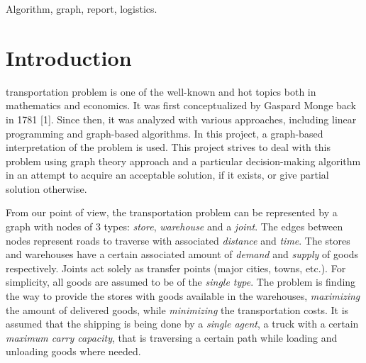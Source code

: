 \documentclass[journal,onecolumn]{IEEEtran}
\begin{document}
\begin{IEEEkeywords}
Algorithm, graph, report, logistics.
\end{IEEEkeywords}

%
\IEEEpeerreviewmaketitle



\section{Introduction}
 transportation problem is one of the well-known and hot topics both in mathematics and economics.
It was first conceptualized by Gaspard Monge back in 1781 [1]. Since then, it was analyzed with various approaches, including linear programming and graph-based algorithms. In this project, a graph-based interpretation of the problem is used. This project strives to deal with this problem using graph theory approach and a particular decision-making algorithm in an attempt to acquire an acceptable solution, if it exists, or give partial solution otherwise.

From our point of view, the transportation problem can be represented by a graph with nodes of 3 types: \textit{store}, \textit{warehouse} and a \textit{joint}. The edges between nodes represent roads to traverse with associated \textit{distance} and \textit{time}. The stores and warehouses have a certain associated amount of \textit{demand} and \textit{supply} of goods respectively. Joints act solely as transfer points (major cities, towns, etc.). For simplicity, all goods are assumed to be of the \textit{single type}. The problem is finding the way to provide the stores with goods available in the warehouses, \textit{maximizing} the amount of delivered goods, while \textit{minimizing} the transportation costs. It is assumed that the shipping is being done by a \textit{single agent}, a truck with a certain \textit{maximum carry capacity}, that is traversing a certain path while loading and unloading goods where needed.
\end{document}
